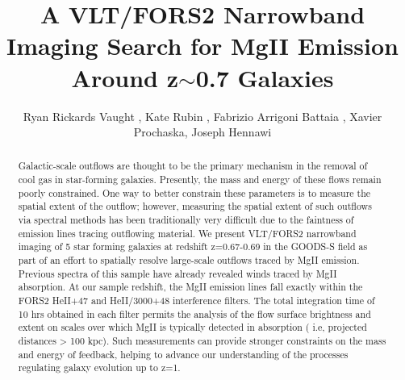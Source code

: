 \documentclass[twocolumn]{aastex6}
\begin{document}
\title{A VLT/FORS2 Narrowband Imaging Search for MgII Emission Around z$\sim$0.7 Galaxies }
\author{Ryan Rickards Vaught , Kate Rubin , Fabrizio Arrigoni Battaia , Xavier Prochaska, Joseph Hennawi}


\begin{abstract}
Galactic-scale outflows are thought to be the primary mechanism in the removal of cool gas in star-forming galaxies. Presently, the mass and energy of these flows remain poorly constrained. One way to better constrain these parameters is to measure the spatial extent of the outflow; however, measuring the spatial extent of such outflows via spectral methods has been traditionally very difficult due to the faintness of emission lines tracing outflowing material. We present VLT/FORS2 narrowband imaging of 5 star forming galaxies at redshift z=0.67-0.69 in the GOODS-S field as part of an effort to spatially resolve large-scale outflows traced by MgII emission. Previous spectra of this sample have already revealed winds traced by MgII absorption. At our sample redshift, the MgII emission lines fall exactly within the FORS2 HeII+47 and HeII/3000+48 interference filters. The total integration time of 10 hrs obtained in each filter permits the analysis of the flow surface brightness and extent on scales over which MgII is typically detected in absorption ( i.e, projected distances > 100 kpc). Such measurements can provide stronger constraints on the mass and energy of feedback, helping to advance our understanding of the processes regulating galaxy evolution up to z=1. 
\end{abstract}

\maketitle
\end{document}

